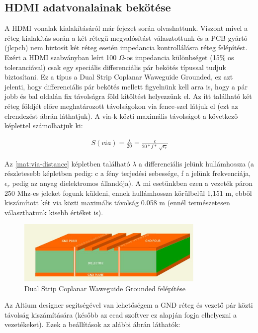 	\subsection{HDMI adatvonalainak bekötése}
	
	A HDMI vonalak kialakításáról már  fejezet során olvashattunk. Viszont mivel a réteg kialakítás során a két rétegű megvalósítást választottunk és a PCB gyártó (jlcpcb) nem biztosít két réteg esetén impedancia kontrollálásra réteg felépítést. Ezért a HDMI szabványban leírt 100 $\Omega$-os impedancia különbséget (15\% os toleranciával) csak egy speciális differenciális pár bekötés típussal tudjuk biztosítani. Ez a típus a Dual Strip Coplanar Waweguide Grounded, ez azt jelenti, hogy differenciális pár bekötés mellett figyelnünk kell arra is, hogy a pár jobb és bal oldalán fix távolságra föld kitöltést helyezzünk el. Az itt található két réteg földjét előre meghatározott távolságokon via fence-szel látjuk el (ezt az elrendezést  ábrán láthatjuk). A via-k közti maximális távolságot a következő képlettel számolhatjuk ki:
	
	\begin{align}
		\label{mat:via-distance}	
		S(via) = \frac{\lambda}{20} = \frac{c}{20 * f * \sqrt[]{\epsilon_r}}
	\end{align}   
	
	Az \ref{mat:via-distance} képletben található $\lambda$ a differenciális jelünk hullámhossza (a részletesebb képletben pedig: c a fény terjedési sebessége, f a jelünk frekvenciája, $\epsilon_r$ pedig az anyag dielektromos állandója). A mi esetünkben ezen a vezeték páron 250 Mhz-es jeleket fogunk küldeni, ennek hullámhossza körülbelül 1,151 m, ebből kiszámított két via közti maximális távolság 0.058 m (ennél természetesen választhatunk kisebb értéket is).
	
	\begin{figure}[H]
		\centering
		\includegraphics[width=90mm, keepaspectratio]{figures/coplanar}
		\caption{Dual Strip Coplanar Waweguide Grounded felépítése} 
		\label{fig:coplanar}
	\end{figure}
	
	Az Altium designer segítségével van lehetőségem a GND réteg és vezető pár közti távolság kiszámítására (később az ecad szoftver ez alapján fogja elhelyezni a vezetékeket). Ezek a beállítások az alábbi ábrán láthatók:      
	

